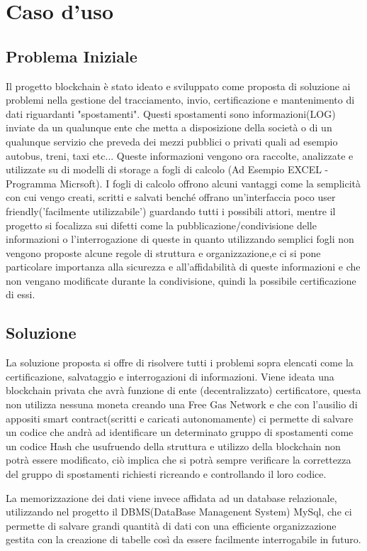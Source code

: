 \documentclass[a4paper]{report}
\begin{document}
\chapter{Caso d'uso}
\section{Problema Iniziale}
Il progetto blockchain è stato ideato e sviluppato come proposta di soluzione ai problemi nella gestione del tracciamento, invio, certificazione e mantenimento di dati riguardanti "spostamenti". Questi spostamenti sono informazioni(LOG) inviate da un qualunque ente che metta a disposizione della società o di un qualunque servizio che preveda dei mezzi pubblici o privati quali ad esempio autobus, treni, taxi etc... Queste informazioni vengono ora raccolte, analizzate e utilizzate su di modelli di storage a fogli di calcolo (Ad Esempio EXCEL - Programma Micrsoft). I fogli di calcolo offrono alcuni vantaggi come la semplicità con cui vengo creati, scritti e salvati benché offrano un'interfaccia poco user friendly('facilmente utilizzabile') guardando tutti i possibili attori, mentre il progetto si focalizza sui difetti come la pubblicazione/condivisione delle informazioni o l'interrogazione di queste in quanto utilizzando semplici fogli non vengono proposte alcune regole di struttura e organizzazione,e ci si pone particolare importanza alla sicurezza e all'affidabilità di queste informazioni e che non vengano modificate durante la condivisione, quindi la possibile certificazione di essi.

\section{Soluzione}
La soluzione proposta si offre di risolvere tutti i problemi sopra elencati come la certificazione, salvataggio e interrogazioni di informazioni. Viene ideata una blockchain privata che avrà funzione di ente (decentralizzato) certificatore, questa non utilizza nessuna moneta creando una Free Gas Network e che con l'ausilio di appositi smart contract(scritti e caricati autonomamente) ci permette di salvare un codice che andrà ad identificare un determinato gruppo di spostamenti come un codice Hash che usufruendo della struttura e utilizzo della blockchain non potrà essere modificato, ciò implica che si potrà sempre verificare la correttezza del gruppo di spostamenti richiesti ricreando e controllando il loro codice.

La memorizzazione dei dati viene invece affidata ad un database relazionale, utilizzando nel progetto il DBMS(DataBase Managenent System) MySql, che ci permette di salvare grandi quantità di dati con una efficiente organizzazione gestita con la creazione di tabelle così da essere facilmente interrogabile in futuro.
 
\end{document}
